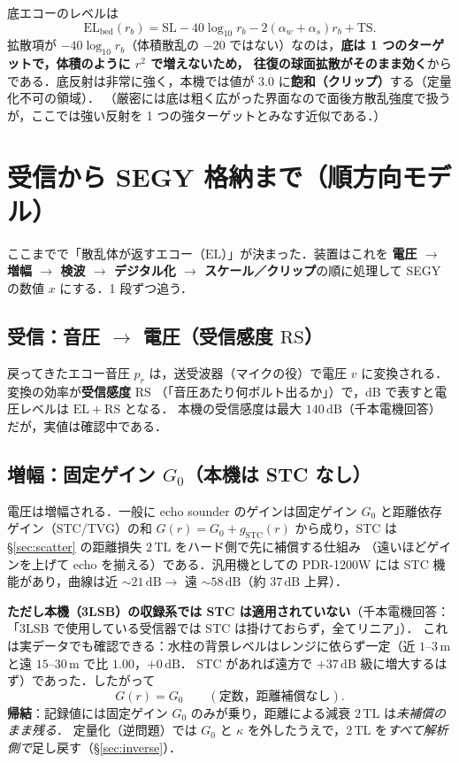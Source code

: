 \documentclass[11pt]{ltjsarticle}
\newcommand{\unit}[1]{\,\mathrm{#1}}
\begin{document}
底エコーのレベルは
\begin{equation}
\mathrm{EL}_{\mathrm{bed}}(r_b)=\mathrm{SL}-40\log_{10} r_b-2(\alpha_w+\alpha_s)r_b+\mathrm{TS}.
\end{equation}
拡散項が $-40\log_{10}r_b$（体積散乱の $-20$ ではない）なのは，\textbf{底は 1 つのターゲットで，体積のように $r^2$ で増えないため，
往復の球面拡散がそのまま効く}からである．底反射は非常に強く，本機では値が $3.0$ に\textbf{飽和（クリップ）}する（定量化不可の領域）．
（厳密には底は粗く広がった界面なので面後方散乱強度で扱うが，ここでは強い反射を 1 つの強ターゲットとみなす近似である．）

\section{受信から SEGY 格納まで（順方向モデル）}
ここまでで「散乱体が返すエコー（$\mathrm{EL}$）」が決まった．装置はこれを
\textbf{電圧 $\to$ 増幅 $\to$ 検波 $\to$ デジタル化 $\to$ スケール／クリップ}の順に処理して SEGY の数値 $x$ にする．1 段ずつ追う．

\subsection{受信：音圧 $\to$ 電圧（受信感度 $\mathrm{RS}$）}
戻ってきたエコー音圧 $p_r$ は，送受波器（マイクの役）で電圧 $v$ に変換される．変換の効率が\textbf{受信感度} $\mathrm{RS}$
（「音圧あたり何ボルト出るか」）で，dB で表すと電圧レベルは $\mathrm{EL}+\mathrm{RS}$ となる．
本機の受信感度は最大 $140\unit{dB}$（千本電機回答）だが，実値は確認中である．

\subsection{増幅：固定ゲイン $G_0$（本機は STC なし）}
\label{ssec:gain}
電圧は増幅される．一般に echo sounder のゲインは固定ゲイン $G_0$ と距離依存ゲイン（STC/TVG）の和
$G(r)=G_0+g_{\mathrm{STC}}(r)$ から成り，STC は \S\ref{sec:scatter} の距離損失 $2\,\mathrm{TL}$ をハード側で先に補償する仕組み
（遠いほどゲインを上げて echo を揃える）である．汎用機としての PDR-1200W には STC 機能があり，曲線は近 $\sim21\unit{dB}\to$ 遠 $\sim58\unit{dB}$（約 $37\unit{dB}$ 上昇）．

\textbf{ただし本機（3LSB）の収録系では STC は適用されていない}（千本電機回答：「3LSB で使用している受信器では STC は掛けておらず，全てリニア」）．
これは実データでも確認できる：水柱の背景レベルはレンジに依らず一定（近 $1$–$3\unit{m}$ と遠 $15$–$30\unit{m}$ で比 $1.00$，$+0\unit{dB}$．
STC があれば遠方で $+37\unit{dB}$ 級に増大するはず）であった．したがって
\begin{equation}
G(r)=G_0\qquad(\text{定数，距離補償なし}).
\end{equation}
\textbf{帰結}：記録値には固定ゲイン $G_0$ のみが乗り，距離による減衰 $2\,\mathrm{TL}$ は\emph{未補償のまま残る}．
定量化（逆問題）では $G_0$ と $\kappa$ を外したうえで，$2\,\mathrm{TL}$ を\emph{すべて解析側で}足し戻す（\S\ref{sec:inverse}）．
\end{document}
